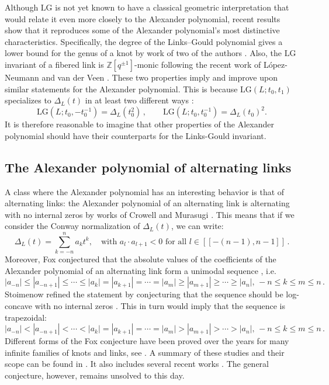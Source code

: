 \documentclass[12pt,reqno]{amsart}
\theoremstyle{definition}
\def\be{\begin{equation}}
\def\ee{\end{equation}}
\def\LG{\mathrm{LG}}
\def\Alex{\Delta}
\def\pser#1{[\![#1]\!]}
\begin{document}
Although $\LG$ is not yet known to have a classical geometric interpretation that would relate it even more closely to the Alexander polynomial, recent results show that it reproduces some of the Alexander polynomial's most distinctive characteristics. Specifically, the degree of the Links--Gould polynomial gives a lower bound for the genus of a knot by work of two of the authors \cite{Kohli-Tahar}. Also, the $\LG$ invariant of a fibered link is $\mathbb{Z}[q^{\pm 1}]$-monic following the recent work of L\'opez-Neumann and van der Veen \cite{LNVdV25}. These two properties imply and improve upon similar statements for the Alexander polynomial. This is because $\LG(L;t_0,t_1)$ specializes to $\Delta_L(t)$ in at least two different ways \cite{DWIL, Kohli, KPM}: 
\be
\label{LGspec}
\LG(L;t_0,-t_0^{-1}) = \Alex_L(t_0^2)\,, \qquad
\LG(L; t_0, t_0^{-1}) = \Alex_L(t_0)^2.
\ee
It is therefore reasonable to imagine that other properties of the Alexander polynomial should have their counterparts for the Links-Gould invariant.


\subsection{The Alexander polynomial of alternating links} A class where the Alexander polynomial has an interesting behavior is that of alternating links: the Alexander polynomial of an alternating link is alternating with no internal zeros by works of Crowell \cite{Cro} and Murasugi \cite{Mur}. This means that if we consider the Conway normalization of $\Delta_L(t)$, we can write:
$$
\Delta_L(t) = \sum_{k=-n}^{n} a_k t^k, \quad \text{with } a_l \cdot a_{l+1} < 0 \text{ for all } l \in \pser{-(n-1), n-1}\,.
$$
Moreover, Fox conjectured that the absolute values of the coefficients of the Alexander polynomial of an alternating link form a unimodal sequence \cite{Fox}, i.e. 
$$
|a_{-n}| \leq |a_{-n+1}| \leq \cdots \leq |a_k| = |a_{k+1}| = \cdots = |a_m| \geq |a_{m+1}| \geq \cdots \geq |a_n| \text{, } -n \leq k \leq m \leq n \,.
$$
Stoimenow refined the statement by conjecturing that the sequence should be log-concave with no internal zeros \cite{Sto}. This in turn would imply that the sequence is trapezoidal:
$$
|a_{-n}| < |a_{-n+1}| < \cdots < |a_k| = |a_{k+1}| = \cdots = |a_m| > |a_{m+1}| > \cdots > |a_n| \text{, } -n \leq k \leq m \leq n \,.
$$
Different forms of the Fox conjecture have been proved over the years for many infinite families of knots and links, see \cite{Par, Hartley, Mur85, OZ, Jong, Sto16, AC, Hafner, azarpendar24, kalman25}. A summary of these studies and their scope can be found in \cite{azarpendar24}. It also includes several recent works \cite{AC, Hafner, azarpendar24, kalman25}. The general conjecture, however, remains unsolved to this day.
\end{document}
